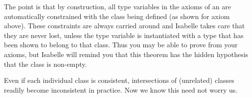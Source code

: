 \begin{isabellebody}
\begin{isamarkuptext}
The point is that by construction, all type variables in the axioms of an
 are automatically constrained with the class being
defined (as shown for axiom  above). These constraints are
always carried around and Isabelle takes care that they are never lost,
unless the type variable is instantiated with a type that has been shown to
belong to that class. Thus you may be able to prove 
from your axioms, but Isabelle will remind you that this
theorem has the hidden hypothesis that the class is non-empty.

Even if each individual class is consistent, intersections of (unrelated)
classes readily become inconsistent in practice. Now we know this need not
worry us.%
\end{isamarkuptext}%
\isamarkuptrue%
%
\isadelimtheory
%
\endisadelimtheory
%
\isatagtheory
\isamarkupfalse%
%
\endisatagtheory
{\isafoldtheory}%
%
\isadelimtheory
%
\endisadelimtheory
\end{isabellebody}%
